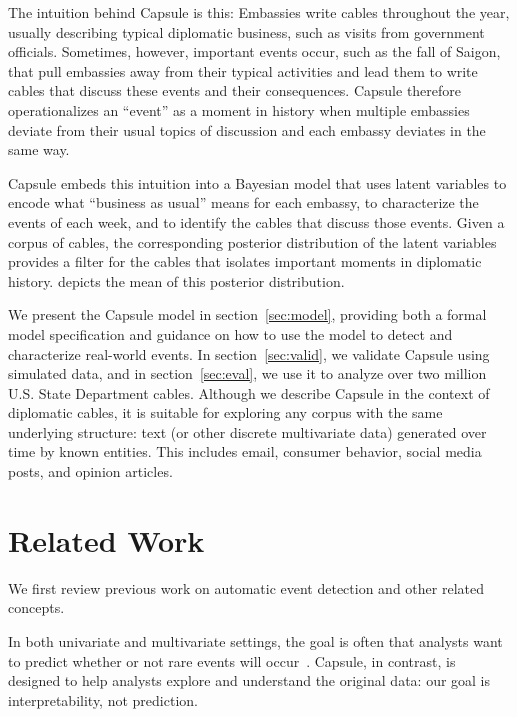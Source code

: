 The intuition behind Capsule is this: Embassies write cables
throughout the year, usually describing typical diplomatic business,
such as visits from government officials. Sometimes, however,
important events occur, such as the fall of Saigon, that pull
embassies away from their typical activities and lead them to write
cables that discuss these events and their consequences. Capsule
therefore operationalizes an ``event'' as a moment in history when
multiple embassies deviate from their usual topics of discussion and
each embassy deviates in the same way.

Capsule embeds this intuition into a Bayesian model that uses latent
variables to encode what ``business as usual'' means for each embassy,
to characterize the events of each week, and to identify the cables
that discuss those events. Given a corpus of cables, the corresponding
posterior distribution of the latent variables provides a filter for
the cables that isolates important moments in diplomatic
history.  depicts the mean of this posterior
distribution.

We present the Capsule model in section~\ref{sec:model}, providing
both a formal model specification and guidance on how to use the model
to detect and characterize real-world events. In
section~\ref{sec:valid}, we validate Capsule using simulated data, and
in section~\ref{sec:eval}, we use it to analyze over two million
U.S. State Department cables. Although we describe Capsule in the
context of diplomatic cables, it is suitable for exploring any corpus
with the same underlying structure: text (or other discrete
multivariate data) generated over time by known entities. This
includes email, consumer behavior, social media posts, and opinion
articles.

\section{Related Work}


We first review previous work on automatic
event detection and other related concepts.

In both univariate and multivariate settings, the goal is often that analysts want to predict whether or not rare events will occur~\cite{weiss1998learning,das2008anomaly}.  Capsule, in contrast, is designed to help analysts explore and understand the original data: our goal is interpretability, not prediction.

